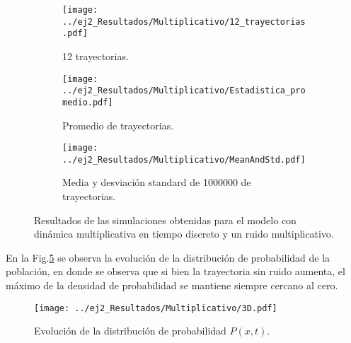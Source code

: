 \begin{figure}[htb!]
    \centering
    \begin{subfigure}[b]{0.47\textwidth}
        \texttt{[image: ../ej2\_Resultados/Multiplicativo/12\_trayectorias.pdf]}
        \caption{12 trayectorias.}
        \label{ej2:12trayectorias_mult}
    \end{subfigure}
    \hfill
    \begin{subfigure}[b]{0.47\textwidth}
        \texttt{[image: ../ej2\_Resultados/Multiplicativo/Estadistica\_promedio.pdf]}
        \caption{Promedio de trayectorias.}
        \label{ej2:estadistica_promedio_mult}
    \end{subfigure}
    \begin{subfigure}[b]{0.47\textwidth}
        \texttt{[image: ../ej2\_Resultados/Multiplicativo/MeanAndStd.pdf]}
        \caption{Media y desviación standard de 1000000 de trayectorias.}
        \label{ej2:mean_std_mult}
    \end{subfigure}
    \caption{Resultados de las simulaciones obtenidas para el modelo con dinámica multiplicativa en tiempo discreto y un ruido multiplicativo.}
    \label{ej2:Resultados_multiplicativo}
\end{figure}

En la Fig.\ref{ej2:3D_multiplicativo} se observa la evolución de la distribución de probabilidad de la población, en donde se observa que si bien la trayectoria sin ruido aumenta, el máximo de la densidad de probabilidad se mantiene siempre cercano al cero.

\begin{figure}[htb!]
    \centering
    \texttt{[image: ../ej2\_Resultados/Multiplicativo/3D.pdf]}
    \caption{Evolución de la distribución de probabilidad $P\left(x,t\right)$.}
    \label{ej2:3D_multiplicativo}
\end{figure}